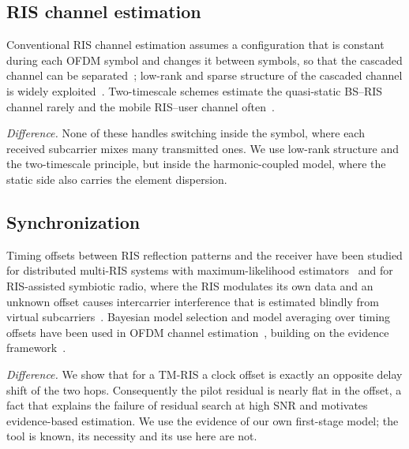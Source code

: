 \subsection{RIS channel estimation}
Conventional RIS channel estimation assumes a configuration that is constant during
each OFDM symbol and changes it between symbols, so that the cascaded channel can be
separated~\cite{zheng2020ofdm}; low-rank and sparse structure of the cascaded channel is
widely exploited~\cite{wang2020compressed}. Two-timescale schemes estimate the
quasi-static BS--RIS channel rarely and the mobile RIS--user channel often~\cite{hu2019twotimescale}.

\emph{Difference.} None of these handles switching inside the symbol, where each
received subcarrier mixes many transmitted ones. We use low-rank structure and the
two-timescale principle, but inside the harmonic-coupled model, where the static side
also carries the element dispersion.

\subsection{Synchronization}
Timing offsets between RIS reflection patterns and the receiver have been studied for
distributed multi-RIS systems with maximum-likelihood estimators~\cite{zhao2022multiris}
and for RIS-assisted symbiotic radio, where the RIS modulates its own data and an
unknown offset causes intercarrier interference that is estimated blindly from virtual
subcarriers~\cite{chen2024sr}. Bayesian model selection and model averaging over timing
offsets have been used in OFDM channel estimation~\cite{access2019bayes,hku2010}, building
on the evidence framework~\cite{mackay1992}.

\emph{Difference.} We show that for a TM-RIS a clock offset is exactly an opposite
delay shift of the two hops. Consequently the pilot residual is nearly flat in the
offset, a fact that explains the failure of residual search at high SNR and motivates
evidence-based estimation. We use the evidence of our own first-stage model; the tool
is known, its necessity and its use here are not.

